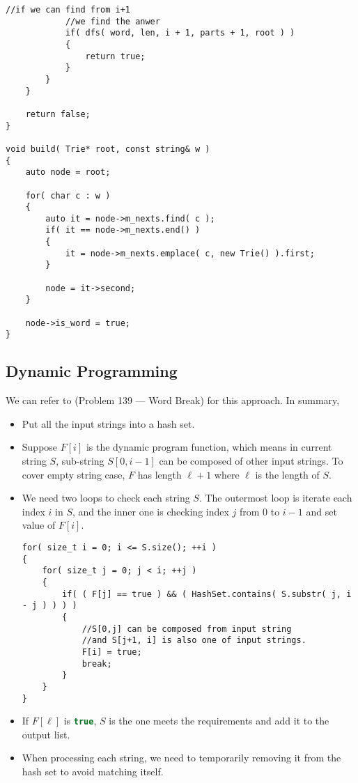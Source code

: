 \begin{lstlisting}[style=customc, caption={DFS And Trie}]
            //if we can find from i+1
            //we find the anwer
            if( dfs( word, len, i + 1, parts + 1, root ) )
            {
                return true;
            }
        }
    }

    return false;
}

void build( Trie* root, const string& w )
{
    auto node = root;

    for( char c : w )
    {
        auto it = node->m_nexts.find( c );
        if( it == node->m_nexts.end() )
        {
            it = node->m_nexts.emplace( c, new Trie() ).first;
        }

        node = it->second;
    }

    node->is_word = true;
}

\end{lstlisting}

\subsection{Dynamic Programming}
We can refer to (Problem 139 --- Word Break) for this approach. In summary, 

\begin{itemize}
\item Put all the input strings into a hash set.
\item Suppose $F[i]$ is the dynamic program function, which means in current string $S$, sub-string $S[0, i-1]$ can be composed of other input strings. To cover empty string case, $F$ has length $\ell+1$ where $\ell$ is the length of $S$.
\item We need two loops to check each string $S$. The outermost loop is iterate each index $i$ in $S$, and the inner one is checking index $j$ from $0$ to $i-1$ and set value of $F[i]$. 

\begin{lstlisting}[style=customc, caption={}]
for( size_t i = 0; i <= S.size(); ++i )
{
    for( size_t j = 0; j < i; ++j )
    {
        if( ( F[j] == true ) && ( HashSet.contains( S.substr( j, i - j ) ) ) )
        {
            //S[0,j] can be composed from input string
            //and S[j+1, i] is also one of input strings.
            F[i] = true;
            break;
        }
    }
}
\end{lstlisting}
\item If $F[\ell]$ is \lstinline[language=C++, basicstyle=\small\ttfamily, keywordstyle=\bfseries\color{green!40!black}]|true|, $S$ is the one meets the requirements and add it to the output list.
\item When processing each string, we need to temporarily removing it from the hash set to avoid matching itself.
\end{itemize}

